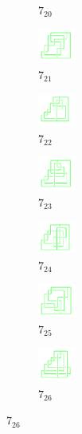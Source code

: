 \documentclass{article}
\theoremstyle{definition}
\theoremstyle{theorem}
\theoremstyle{proposition}
\theoremstyle{corollary}
\begin{document}
\begin{figure}[H]
\begin{subfigure}{0.075\textwidth}
    \caption{$7_{20}$} 
    \end{subfigure}
    \begin{subfigure}{0.075\textwidth}
    \includegraphics[width=1.25cm]{../Midterm_Poster/grid_diagram/handcuff_7_21.png}
    \caption{$7_{21}$} 
    \end{subfigure}
    \begin{subfigure}{0.075\textwidth}
    \includegraphics[width=1.25cm]{../Midterm_Poster/grid_diagram/handcuff_7_22.png}
    \caption{$7_{22}$} 
    \end{subfigure}
    \begin{subfigure}{0.075\textwidth}
    \includegraphics[width=1.25cm]{../Midterm_Poster/grid_diagram/handcuff_7_23.png}
    \caption{$7_{23}$} 
    \end{subfigure}
    \begin{subfigure}{0.075\textwidth}
    \includegraphics[width=1.25cm]{../Midterm_Poster/grid_diagram/handcuff_7_24.png}
    \caption{$7_{24}$} 
    \end{subfigure}
    \begin{subfigure}{0.075\textwidth}
    \includegraphics[width=1.25cm]{../Midterm_Poster/grid_diagram/handcuff_7_25.png}
    \caption{$7_{25}$} 
    \end{subfigure}
    \begin{subfigure}{0.075\textwidth}
    \includegraphics[width=1.25cm]{../Midterm_Poster/grid_diagram/handcuff_7_26.png}
    \caption{$7_{26}$} 
    \end{subfigure}

\end{figure}
\end{document}
